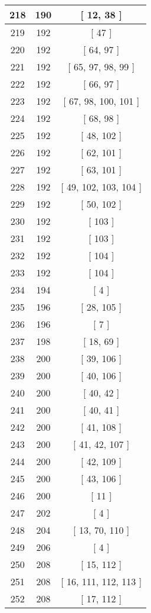 \begin{center}
\begin{longtable}[H]{|| c c c ||}
\hline
218 & 190 & [ 12, 38 ] \\ 
\hline
219 & 192 & [ 47 ] \\ 
\hline
220 & 192 & [ 64, 97 ] \\ 
\hline
221 & 192 & [ 65, 97, 98, 99 ] \\ 
\hline
222 & 192 & [ 66, 97 ] \\ 
\hline
223 & 192 & [ 67, 98, 100, 101 ] \\ 
\hline
224 & 192 & [ 68, 98 ] \\ 
\hline
225 & 192 & [ 48, 102 ] \\ 
\hline
226 & 192 & [ 62, 101 ] \\ 
\hline
227 & 192 & [ 63, 101 ] \\ 
\hline
228 & 192 & [ 49, 102, 103, 104 ] \\ 
\hline
229 & 192 & [ 50, 102 ] \\ 
\hline
230 & 192 & [ 103 ] \\ 
\hline
231 & 192 & [ 103 ] \\ 
\hline
232 & 192 & [ 104 ] \\ 
\hline
233 & 192 & [ 104 ] \\ 
\hline
234 & 194 & [ 4 ] \\ 
\hline
235 & 196 & [ 28, 105 ] \\ 
\hline
236 & 196 & [ 7 ] \\ 
\hline
237 & 198 & [ 18, 69 ] \\ 
\hline
238 & 200 & [ 39, 106 ] \\ 
\hline
239 & 200 & [ 40, 106 ] \\ 
\hline
240 & 200 & [ 40, 42 ] \\ 
\hline
241 & 200 & [ 40, 41 ] \\ 
\hline
242 & 200 & [ 41, 108 ] \\ 
\hline
243 & 200 & [ 41, 42, 107 ] \\ 
\hline
244 & 200 & [ 42, 109 ] \\ 
\hline
245 & 200 & [ 43, 106 ] \\ 
\hline
246 & 200 & [ 11 ] \\ 
\hline
247 & 202 & [ 4 ] \\ 
\hline
248 & 204 & [ 13, 70, 110 ] \\ 
\hline
249 & 206 & [ 4 ] \\ 
\hline
250 & 208 & [ 15, 112 ] \\ 
\hline
251 & 208 & [ 16, 111, 112, 113 ] \\ 
\hline
252 & 208 & [ 17, 112 ] \\ 

\end{longtable}
\end{center}
